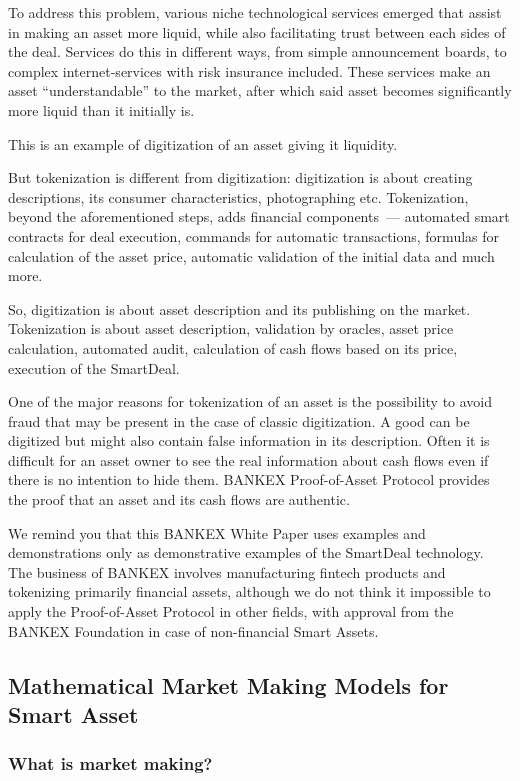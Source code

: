 \documentclass{article}
\begin{document}
\begin{multicols}{2}
To address this problem, various niche technological services emerged that assist in making an asset more liquid, while also facilitating trust between each sides of the deal. Services do this in different ways, from simple announcement boards, to complex internet-services with risk insurance included. These services make an asset “understandable” to the market, after which said asset becomes significantly more liquid than it initially is.

This is an example of digitization of an asset giving it liquidity.

But tokenization is different from digitization: digitization is about creating descriptions, its consumer characteristics, photographing etc. Tokenization, beyond the aforementioned steps, adds financial components~--- automated smart contracts for deal execution, commands for automatic transactions, formulas for calculation of the asset price, automatic validation of the initial data and much more.

So, digitization is about asset description and its publishing on the market. Tokenization is about asset description, validation by oracles, asset price calculation, automated audit, calculation of cash flows based on its price, execution of the SmartDeal.

One of the major reasons for tokenization of an asset is the possibility to avoid fraud that may be present in the case of classic digitization. A good can be digitized but might also contain false information in its description. Often it is difficult for an asset owner to see the real information about cash flows even if there is no intention to hide them. BANKEX Proof-of-Asset Protocol provides the proof that an asset and its cash flows are authentic.

We remind you that this BANKEX White Paper uses examples and demonstrations only as demonstrative examples of the SmartDeal technology. The business of BANKEX involves manufacturing fintech products and tokenizing primarily financial assets, although we do not think it impossible to apply the Proof-of-Asset Protocol in other fields, with approval from the BANKEX Foundation in case of non-financial Smart Assets. 

\subsection{Mathematical Market Making Models for Smart Asset}

\subsubsection*{What is market making?}


\end{multicols}
\end{document}
